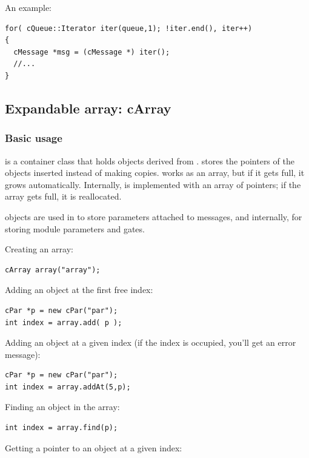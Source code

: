 An example:

\begin{verbatim}
for( cQueue::Iterator iter(queue,1); !iter.end(), iter++)
{
  cMessage *msg = (cMessage *) iter();
  //...
}
\end{verbatim}




\subsection{Expandable array: cArray}

\subsubsection{Basic usage}


 is a container class that holds objects derived from
.  stores the pointers of the objects
inserted instead of making copies.  works as an array,
but if it gets full, it grows automatically. Internally,
 is implemented with an array of pointers; if the array
gets full, it is reallocated.

 objects are used in {\opp} to store parameters
attached to messages, and internally, for storing module parameters
and gates.


Creating an array:

\begin{verbatim}
cArray array("array");
\end{verbatim}

Adding an object at the first free index:

\begin{verbatim}
cPar *p = new cPar("par");
int index = array.add( p );
\end{verbatim}


Adding an object at a given index (if the index is occupied,
you'll get an error message):

\begin{verbatim}
cPar *p = new cPar("par");
int index = array.addAt(5,p);
\end{verbatim}


Finding an object in the array:

\begin{verbatim}
int index = array.find(p);
\end{verbatim}

Getting a pointer to an object at a given index:


